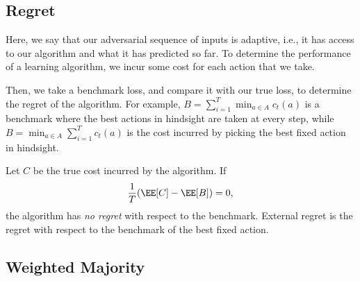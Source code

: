 \subsection{Regret}

Here, we say that our adversarial sequence of inputs is \ac{adaptive}, i.e., it has access to our algorithm and what it has predicted so far. To determine the performance of a learning algorithm, we incur some cost for each action that we take. 

Then, we take a benchmark loss, and compare it with our true loss, to determine the \ac{regret} of the algorithm. For example, $B = \sum_{i=1}^T\min_{a\in A}c_t(a)$ is a benchmark where the best actions in hindsight are taken at every step, while $B = \min_{a\in A}\sum_{i=1}^Tc_t(a)$ is the cost incurred by picking the best fixed action in hindsight. 

Let $C$ be the true cost incurred by the algorithm. If 
\[\frac{1}{T}(\EE[C]-\EE[B])=0,\]
the algorithm has \textit{no regret} with respect to the benchmark. \ac{External regret} is the regret with respect to the benchmark of the best fixed action.

\subsection{Weighted Majority}



